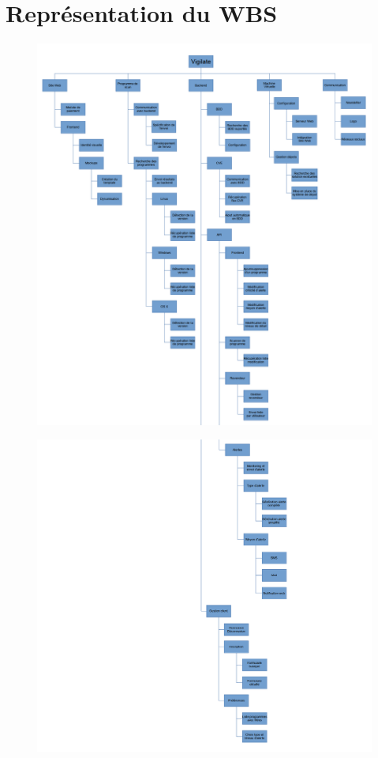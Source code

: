 \documentclass[a4paper,12pt]{report}
\begin{document}
\section{Représentation du WBS}

\begin{figure}
\includegraphics[width=18cm]{wbs2_21.png}
\end{figure}

\begin{figure}
\includegraphics[width=18cm]{wbs2_22.png}
\end{figure}

\newpage


\end{document}
